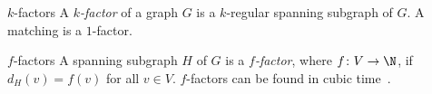 \begin{frame}{$k$-factors}
    \centering
    A \emph{$k$-factor} of a graph $G$ is a $k$-regular spanning subgraph of $G$.
    \bigbreak
    \pause
    A matching is a $1$-factor.
\end{frame}

\begin{frame}{$f$-factors}
    \centering
    A spanning subgraph $H$ of $G$ is a \emph{$f$-factor}, where $f \colon V \to \N$, if $d_H(v) = f(v)$ for all $v \in V$.
    \bigbreak
    \pause
    $f$-factors can be found in cubic time~\cite{Ans85}.
\end{frame}